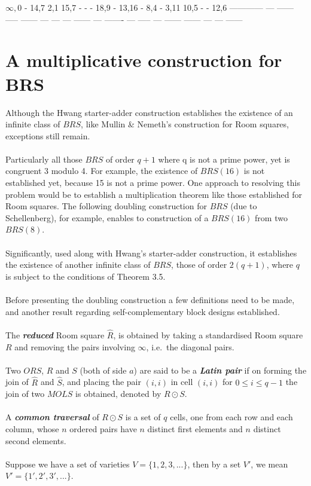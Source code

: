 \documentclass[
  12pt,
  a4paper]{book}
\begin{document}
\(\infty,0\) - 14,7 2,1 15,7 - - - 18,9 - 13,16 - 8,4 - 3,11 10,5 - - 12,6
------------ --- ------ ----- ------ --- --- --- ------ --- ------- --- ----- --- ------ ------ --- --- ------

\hypertarget{a-multiplicative-construction-for-brs}{%
\section{A multiplicative construction for BRS}\label{a-multiplicative-construction-for-brs}}

Although the Hwang starter-adder construction establishes the existence
of an infinite class of \(BRS\), like Mullin \& Nemeth's construction for
Room squares, exceptions still remain.\\
~\\
Particularly all those \(BRS\) of order \(q+1\) where q is not a prime
power, yet is congruent 3 modulo 4. For example, the existence of
\(BRS(16)\) is not established yet, because 15 is not a prime power. One
approach to resolving this problem would be to establish a
multiplication theorem like those established for Room squares. The
following doubling construction for \(BRS\) (due to Schellenberg), for
example, enables to construction of a \(BRS(16)\) from two \(BRS(8)\).\\
~\\
Significantly, used along with Hwang's starter-adder construction, it
establishes the existence of another infinite class of \(BRS\), those of
order \(2(q+1)\), where \(q\) is subject to the conditions of Theorem 3.5.\\
~\\
Before presenting the doubling construction a few definitions need to be
made, and another result regarding self-complementary block designs
established.\\
~\\
The \textbf{\emph{reduced}} Room square \(\hat{R}\), is obtained by taking a
standardised Room square \(R\) and removing the pairs involving \(\infty\),
i.e.~the diagonal pairs.\\
~\\
Two \(ORS\), \(R\) and \(S\) (both of side \(a\)) are said to be a \textbf{\emph{Latin
pair}} if on forming the join of \(\hat{R}\) and \(\hat{S}\), and placing
the pair \((i,i)\) in cell \((i,i)\) for \(0 \leq i \leq q-1\) the join of two
\(MOLS\) is obtained, denoted by \(R \odot S\).\\
~\\
A \textbf{\emph{common traversal}} of \(R \odot S\) is a set of \(q\) cells, one from
each row and each column, whose \(n\) ordered pairs have \(n\) distinct
first elements and \(n\) distinct second elements.\\
~\\
Suppose we have a set of varieties \(V = \{1,2,3,...\}\), then by a set
\(V'\), we mean \(V'=\{1',2',3',...\}\).
\end{document}
